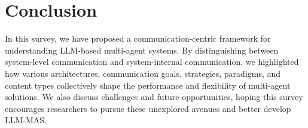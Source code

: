 \section{Conclusion}
In this survey, we have proposed a communication-centric framework for understanding LLM-based multi-agent systems. By distinguishing between system-level communication and system-internal communication, we highlighted how various architectures, communication goals, strategies, paradigms, and content types collectively shape the performance and flexibility of multi-agent solutions. We also discuss challenges and future opportunities, hoping this survey encourages researchers to pursue these unexplored avenues and better develop LLM-MAS.